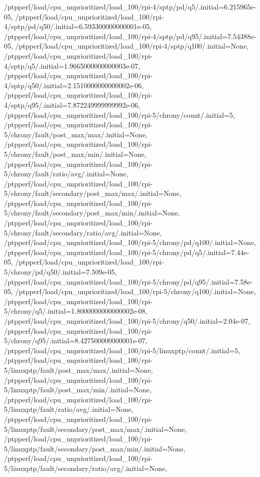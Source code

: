{    /ptpperf/load/cpu_unprioritized/load_100/rpi-4/sptp/pd/q5/.initial=6.215965e-05,
    /ptpperf/load/cpu_unprioritized/load_100/rpi-4/sptp/pd/q50/.initial=6.593300000000001e-05,
    /ptpperf/load/cpu_unprioritized/load_100/rpi-4/sptp/pd/q95/.initial=7.54388e-05,
    /ptpperf/load/cpu_unprioritized/load_100/rpi-4/sptp/q100/.initial=None,
    /ptpperf/load/cpu_unprioritized/load_100/rpi-4/sptp/q5/.initial=1.9665000000000003e-07,
    /ptpperf/load/cpu_unprioritized/load_100/rpi-4/sptp/q50/.initial=2.1510000000000002e-06,
    /ptpperf/load/cpu_unprioritized/load_100/rpi-4/sptp/q95/.initial=7.872249999999992e-06,
    /ptpperf/load/cpu_unprioritized/load_100/rpi-5/chrony/count/.initial=5,
    /ptpperf/load/cpu_unprioritized/load_100/rpi-5/chrony/fault/post_max/max/.initial=None,
    /ptpperf/load/cpu_unprioritized/load_100/rpi-5/chrony/fault/post_max/min/.initial=None,
    /ptpperf/load/cpu_unprioritized/load_100/rpi-5/chrony/fault/ratio/avg/.initial=None,
    /ptpperf/load/cpu_unprioritized/load_100/rpi-5/chrony/fault/secondary/post_max/max/.initial=None,
    /ptpperf/load/cpu_unprioritized/load_100/rpi-5/chrony/fault/secondary/post_max/min/.initial=None,
    /ptpperf/load/cpu_unprioritized/load_100/rpi-5/chrony/fault/secondary/ratio/avg/.initial=None,
    /ptpperf/load/cpu_unprioritized/load_100/rpi-5/chrony/pd/q100/.initial=None,
    /ptpperf/load/cpu_unprioritized/load_100/rpi-5/chrony/pd/q5/.initial=7.44e-05,
    /ptpperf/load/cpu_unprioritized/load_100/rpi-5/chrony/pd/q50/.initial=7.509e-05,
    /ptpperf/load/cpu_unprioritized/load_100/rpi-5/chrony/pd/q95/.initial=7.58e-05,
    /ptpperf/load/cpu_unprioritized/load_100/rpi-5/chrony/q100/.initial=None,
    /ptpperf/load/cpu_unprioritized/load_100/rpi-5/chrony/q5/.initial=1.8000000000000002e-08,
    /ptpperf/load/cpu_unprioritized/load_100/rpi-5/chrony/q50/.initial=2.04e-07,
    /ptpperf/load/cpu_unprioritized/load_100/rpi-5/chrony/q95/.initial=8.427500000000001e-07,
    /ptpperf/load/cpu_unprioritized/load_100/rpi-5/linuxptp/count/.initial=5,
    /ptpperf/load/cpu_unprioritized/load_100/rpi-5/linuxptp/fault/post_max/max/.initial=None,
    /ptpperf/load/cpu_unprioritized/load_100/rpi-5/linuxptp/fault/post_max/min/.initial=None,
    /ptpperf/load/cpu_unprioritized/load_100/rpi-5/linuxptp/fault/ratio/avg/.initial=None,
    /ptpperf/load/cpu_unprioritized/load_100/rpi-5/linuxptp/fault/secondary/post_max/max/.initial=None,
    /ptpperf/load/cpu_unprioritized/load_100/rpi-5/linuxptp/fault/secondary/post_max/min/.initial=None,
    /ptpperf/load/cpu_unprioritized/load_100/rpi-5/linuxptp/fault/secondary/ratio/avg/.initial=None,
}
